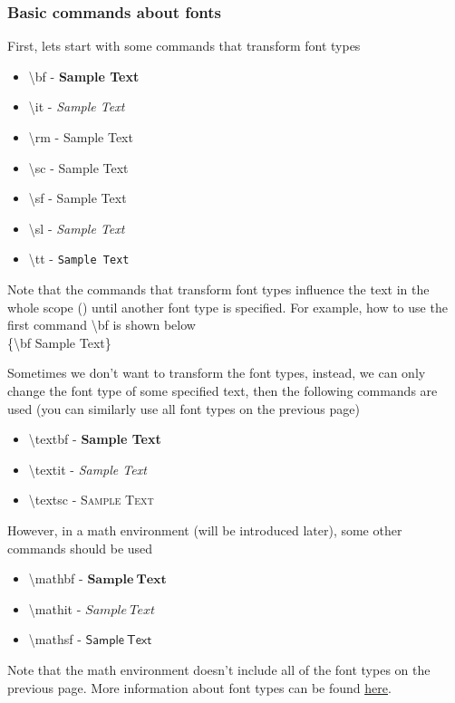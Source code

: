 \documentclass{beamer}
\begin{document}
\begin{frame}
	\frametitle{Basic commands about fonts}
	First, lets start with some commands that transform font types
	\begin{itemize}
		\item \alert{\textbackslash bf} - {\bf Sample Text}
		\item \alert{\textbackslash it} - {\it Sample Text}
		\item \alert{\textbackslash rm} - {\rm Sample Text}
		\item \alert{\textbackslash sc} - {\sc Sample Text}
		\item \alert{\textbackslash sf} - {\sf Sample Text}
		\item \alert{\textbackslash sl} - {\sl Sample Text}
		\item \alert{\textbackslash tt} - {\tt Sample Text}
	\end{itemize}
	Note that the commands that transform font types influence the text in the whole scope () until another font type is specified. For example, how to use the first command \alert{\textbackslash bf} is shown below\\[0.5em]
	\{\alert{\textbackslash bf} Sample Text\}
\end{frame}

\begin{frame}
	Sometimes we don't want to transform the font types, instead, we can only change the font type of some specified text, then the following commands are used (you can similarly use all font types on the previous page)
	\begin{itemize}
		\item \alert{\textbackslash textbf} - \textbf{Sample Text}
		\item \alert{\textbackslash textit} - \textit{Sample Text}
		\item \alert{\textbackslash textsc} - \textsc{Sample Text}
	\end{itemize}
	However, in a math environment (will be introduced later), some other commands should be used
	\begin{itemize}
		\item \alert{\textbackslash mathbf} - $\mathbf{Sample\ Text}$
		\item \alert{\textbackslash mathit} - $\mathit{Sample\ Text}$
		\item \alert{\textbackslash mathsf} - $\mathsf{Sample\ Text}$
	\end{itemize}
	Note that the math environment doesn't include all of the font types on the previous page. More information about font types can be found \href{http://www.cnblogs.com/make217/p/6123532.html}{\color{blue}\underline{here}}.
\end{frame}
\end{document}
